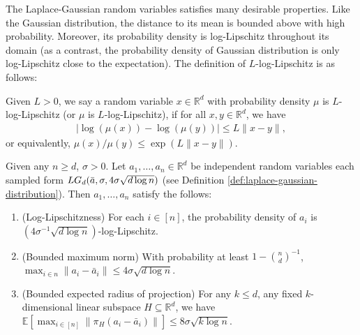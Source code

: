 \documentclass{theoretics}
\newcommand{\R}{\mathbb R}
\newcommand{\E}{\mathbb E}
\renewcommand{\subset}{\subseteq}
\begin{document}
The Laplace-Gaussian random variables satisfies many desirable properties. Like the
Gaussian distribution, the distance to its mean is bounded above with high
probability. Moreover, its probability density is log-Lipschitz throughout its
domain (as a contrast, the probability density of Gaussian distribution is only
log-Lipschitz close to the expectation).  The definition of $L$-log-Lipschitz
is as follows:

\begin{definition}\label{def:log-lipschitz}
    Given $L > 0$, we say a random variable $x \in \R^d$ with probability density $\mu$ is $L$-log-Lipschitz (or $\mu$ is $L$-log-Lipschitz), if for all $x, y\in \R^d$, we have
    \begin{align*}
        |\log(\mu(x)) - \log(\mu(y))| \leq L\|x - y\|,
    \end{align*}
    or equivalently, $\mu(x) / \mu(y) \leq \exp(L\|x - y\|)$.
\end{definition}

\begin{lemma}\label{lem:properties-laplace-gaussian}
    Given any $n \geq d$, $\sigma > 0$. Let $a_1, \ldots, a_n \in \R^d$ be independent random variables each sampled form $LG_d(\Bar{a}, \sigma, 4\sigma \sqrt{d \log n})$ (see Definition \ref{def:laplace-gaussian-distribution}).
    Then $a_1, \ldots, a_n$ satisfy the follows:
    \begin{enumerate}
        \item (Log-Lipschitzness) For each $i \in [n]$, the probability density of $a_i$ is $(4\sigma^{-1} \sqrt{d\log n})$-log-Lipschitz.
        \item (Bounded maximum norm) 
        With probability at least $1 - \binom{n}{d}^{-1}$, $\max_{i \in n} \|a_i - \bar{a}_i\| \leq 4\sigma \sqrt{d \log n}$.%
        \item (Bounded expected radius of projection)  For any $k \leq d$, any fixed $k$-dimensional linear subspace $H \subset \R^d$, we have $\E[\max_{i \in [n]}\|\pi_H(a_i - \bar{a}_i)\|] \leq 8\sigma\sqrt{k\log n}$.%
    \end{enumerate}
\end{lemma}
\end{document}
